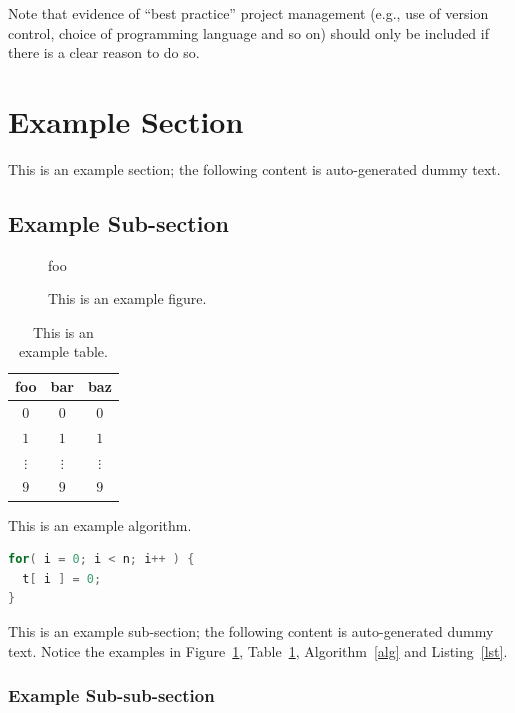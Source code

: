 \documentclass[ %
                    author={Sam Phippen},
                supervisor={Dr. Rafal Bogacz},
                     title={Real time voice activity detectors in noisy personal computing environments},
                  subtitle={},
                    degree={MEng},
                      year={2012} ]{thesis}
\begin{document}
\noindent
Note that evidence of ``best practice'' project management (e.g., use of 
version control, choice of programming language and  so on) should only 
be included if there is a clear reason to do so.

\section{Example Section}

This is an example section; 
the following content is auto-generated dummy text.
\lipsum

\subsection{Example Sub-section}

\begin{figure}[t]
\centering
foo
\caption{This is an example figure.}
\label{fig}
\end{figure}

\begin{table}[t]
\centering
\begin{tabular}{|cc|c|}
\hline
foo      & bar      & baz      \\
\hline
$0     $ & $0     $ & $0     $ \\
$1     $ & $1     $ & $1     $ \\
$\vdots$ & $\vdots$ & $\vdots$ \\
$9     $ & $9     $ & $9     $ \\
\hline
\end{tabular}
\caption{This is an example table.}
\label{tab}
\end{table}

\begin{algorithm}[t]
\caption{This is an example algorithm.}
\label{alg}
\end{algorithm}

\begin{lstlisting}[float={t},caption={This is an example listing.},label={lst},language=C]
for( i = 0; i < n; i++ ) {
  t[ i ] = 0;
}
\end{lstlisting}

This is an example sub-section;
the following content is auto-generated dummy text.
Notice the examples in Figure~\ref{fig}, Table~\ref{tab}, Algorithm~\ref{alg}
and Listing~\ref{lst}.
\lipsum

\subsubsection{Example Sub-sub-section}
\end{document}
